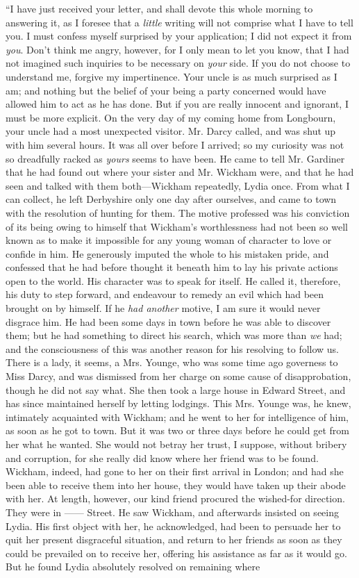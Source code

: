 \documentclass[12pt,openright]{book}
\begin{document}
“I have just received your letter, and shall devote this whole morning to answering it, as I foresee that a \textit{little} writing will not comprise what I have to tell you. I must confess myself surprised by your application; I did not expect it from \textit{you}. Don’t think me angry, however, for I only mean to let you know, that I had not imagined such inquiries to be necessary on \textit{your} side. If you do not choose to understand me, forgive my impertinence. Your uncle is as much surprised as I am; and nothing but the belief of your being a party concerned would have allowed him to act as he has done. But if you are really innocent and ignorant, I must be more explicit. On the very day of my coming home from Longbourn, your uncle had a most unexpected visitor. Mr. Darcy called, and was shut up with him several hours. It was all over before I arrived; so my curiosity was not so dreadfully racked as \textit{yours} seems to have been. He came to tell Mr. Gardiner that he had found out where your sister and Mr. Wickham were, and that he had seen and talked with them both—Wickham repeatedly, Lydia once. From what I can collect, he left Derbyshire only one day after ourselves, and came to town with the resolution of hunting for them. The motive professed was his conviction of its being owing to himself that Wickham’s worthlessness had not been so well known as to make it impossible for any young woman of character to love or confide in him. He generously imputed the whole to his mistaken pride, and confessed that he had before thought it beneath him to lay his private actions open to the world. His character was to speak for itself. He called it, therefore, his duty to step forward, and endeavour to remedy an evil which had been brought on by himself. If he \textit{had another} motive, I am sure it would never disgrace him. He had been some days in town before he was able to discover them; but he had something to direct his search, which was more than \textit{we} had; and the consciousness of this was another reason for his resolving to follow us. There is a lady, it seems, a Mrs. Younge, who was some time ago governess to Miss Darcy, and was dismissed from her charge on some cause of disapprobation, though he did not say what. She then took a large house in Edward Street, and has since maintained herself by letting lodgings. This Mrs. Younge was, he knew, intimately acquainted with Wickham; and he went to her for intelligence of him, as soon as he got to town. But it was two or three days before he could get from her what he wanted. She would not betray her trust, I suppose, without bribery and corruption, for she really did know where her friend was to be found. Wickham, indeed, had gone to her on their first arrival in London; and had she been able to receive them into her house, they would have taken up their abode with her. At length, however, our kind friend procured the wished-for direction. They were in —— Street. He saw Wickham, and afterwards insisted on seeing Lydia. His first object with her, he acknowledged, had been to persuade her to quit her present disgraceful situation, and return to her friends as soon as they could be prevailed on to receive her, offering his assistance as far as it would go. But he found Lydia absolutely resolved on remaining where 
\end{document}
